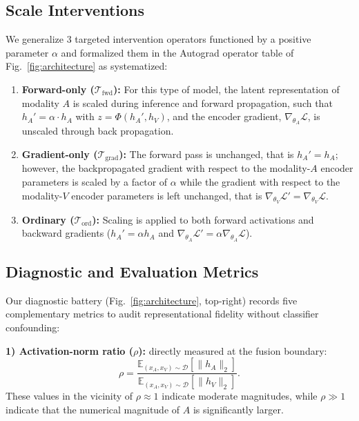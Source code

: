 \documentclass[conference]{IEEEtran}
\begin{document}
\subsection{Scale Interventions}
We generalize 3 targeted intervention operators functioned by a positive parameter $\alpha$ and formalized them in the Autograd operator table of Fig.~\ref{fig:architecture} as systematized:
\begin{enumerate}
    \item \textbf{Forward-only ($\mathcal{T}_{\text{fwd}}$):} For this type of model, the latent representation of modality $A$ is scaled during inference and forward propagation, such that $h_A' = \alpha \cdot h_A$ with $z = \Phi(h_A', h_V)$, and the encoder gradient, $\nabla_{\theta_A}\mathcal{L}$, is unscaled through back propagation.
    \item \textbf{Gradient-only ($\mathcal{T}_{\text{grad}}$):} The forward pass is unchanged, that is $h_A' = h_A$; however, the backpropagated gradient with respect to the modality-$A$ encoder parameters is scaled by a factor of $\alpha$ while the gradient with respect to the modality-$V$ encoder parameters is left unchanged, that is $\nabla_{\theta_V}\mathcal{L}' = \nabla_{\theta_V}\mathcal{L}$.
    \item \textbf{Ordinary ($\mathcal{T}_{\text{ord}}$):} Scaling is applied to both forward activations and backward gradients ($h_A' = \alpha h_A$ and $\nabla_{\theta_A}\mathcal{L}' = \alpha \nabla_{\theta_A}\mathcal{L}$).
\end{enumerate}

\subsection{Diagnostic and Evaluation Metrics}
Our diagnostic battery (Fig.~\ref{fig:architecture}, top-right) records five complementary metrics to audit representational fidelity without classifier confounding:

\textbf{1) Activation-norm ratio ($\rho$):} directly measured at the fusion boundary:
\begin{equation}
    \rho = \frac{\mathbb{E}_{(x_A, x_V) \sim \mathcal{D}} [\|h_A\|_2]}{\mathbb{E}_{(x_A, x_V) \sim \mathcal{D}} [\|h_V\|_2]}.
    \label{eq:activation_ratio}
\end{equation}
These values in the vicinity of $\rho \approx 1$ indicate moderate magnitudes, while $\rho \gg 1$ indicate that the numerical magnitude of $A$ is significantly larger.
\end{document}
